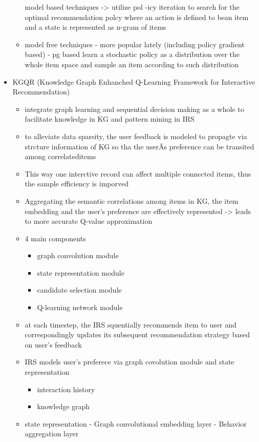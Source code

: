 \documentclass{report}
\begin{document}
\begin{itemize}
\begin{itemize}
         model based techniques -> utilize pol  -icy iteration to search for the optimal recommendation polcy where an action is defined to bean item and a state is represented as n-gram of items
        \item  model free techniques
    - more popular lately (including policy gradient based)
    - pg based learn a stochastic policy as a distribution over the whole item space and sample an item according to such distribution
\end{itemize}
\item KGQR (Knowledge Graph Enhanched Q-Learning Framework for Interactive Recommendation)
\begin{itemize}
    \item integrate graph learning and sequential decision making as a whole to facilitate knowledge in KG and pattern mining in IRS
    \item to alleviate data sparsity, the user feedback is modeled to propagte via strcture information of KG so tha the userÄs preference can be transited among correlateditems
    \item This way one interctive record can affect multiple connected items, thus the sample efficiency is imporved
    \item Aggregating the semantic correlations among items in KG, the item embedding and the user's preference are effectively represented -> leads to more accurate Q-value approximation

    \item 4 main components
    \begin{itemize}
        \item graph convolution module
        \item state representation module
        \item candidate selection module
        \item Q-learning network module
    \end{itemize}
        

    \item at each timestep, the IRS squentially recommends item to user and correspondingly updates its subsequent recommendation strategy based on user's feedback
    \item IRS models user's preferece via graph covolution module and state representation
    \begin{itemize}
        \item interaction history
        \item knowledge graph
    \end{itemize}
        

    \item state representation
        - Graph convolutional embedding layer
        -  Behavior aggregation layer
    \end{itemize}
\end{itemize}
\end{document}
